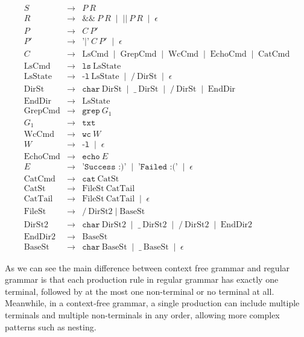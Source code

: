 \documentclass[10pt, a4paper]{article}
\begin{document}
\begin{abcliste}
\begin{eqnarray*}
S &\rightarrow& P \ R \\
R &\rightarrow& \texttt{\&\&}\ P\ R \;\mid\; \texttt{||}\ P\ R \;\mid\; \epsilon \\
P &\rightarrow& C \ P' \\
P' &\rightarrow& \texttt{'|'}\ C \ P' \;\mid\; \epsilon \\
C &\rightarrow& \text{LsCmd} \;\mid\; \text{GrepCmd} \;\mid\; \text{WcCmd} \;\mid\; \text{EchoCmd} \;\mid\; \text{CatCmd} \\[5pt]
\text{LsCmd} &\rightarrow& \texttt{ls}\ \text{LsState} \\
\text{LsState} &\rightarrow& \texttt{-l}\ \text{LsState} \;\mid\; \texttt{/}\ \text{DirSt} \;\mid\; \epsilon \\
\text{DirSt} &\rightarrow& \texttt{char}\ \text{DirSt} \;\mid\; \texttt{\_}\ \text{DirSt} \;\mid\; \texttt{/}\ \text{DirSt} \;\mid\; \text{EndDir} \\
\text{EndDir} &\rightarrow& \text{LsState} \\[5pt]
\text{GrepCmd} &\rightarrow& \texttt{grep}\ G_1 \\
G_1 &\rightarrow& \texttt{txt} \\[5pt]
\text{WcCmd} &\rightarrow& \texttt{wc}\ W \\
W &\rightarrow& \texttt{-l} \;\mid\; \epsilon \\[5pt]
\text{EchoCmd} &\rightarrow& \texttt{echo}\ E \\
E &\rightarrow& \texttt{'Success :)'} \;\mid\; \texttt{'Failed :('} \;\mid\; \epsilon \\
\text{CatCmd} &\rightarrow& \texttt{cat}\ \text{CatSt} \\
\text{CatSt} &\rightarrow& \text{FileSt}\ \text{CatTail} \\
\text{CatTail} &\rightarrow& \text{FileSt}\ \text{CatTail} \;\mid\; \epsilon \\
\text{FileSt} &\rightarrow& \texttt{/}\ \text{DirSt2} \;\mid\; \text{BaseSt} \\
\text{DirSt2} &\rightarrow& \texttt{char}\ \text{DirSt2} \;\mid\; \texttt{\_}\ \text{DirSt2} \;\mid\; \texttt{/}\ \text{DirSt2} \;\mid\; \text{EndDir2} \\
\text{EndDir2} &\rightarrow& \text{BaseSt} \\
\text{BaseSt} &\rightarrow& \texttt{char}\ \text{BaseSt} \;\mid\; \texttt{\_}\ \text{BaseSt} \;\mid\; \epsilon
\end{eqnarray*}

As we can see the main difference between context free grammar and regular grammar is that each production rule in regular grammar has exactly one terminal, followed by at the most one non-terminal or no terminal at all. Meanwhile, in a context‐free grammar, a single production can include multiple terminals and multiple non-terminals in any order, allowing more complex patterns such as nesting.

\end{abcliste}
\end{document}
